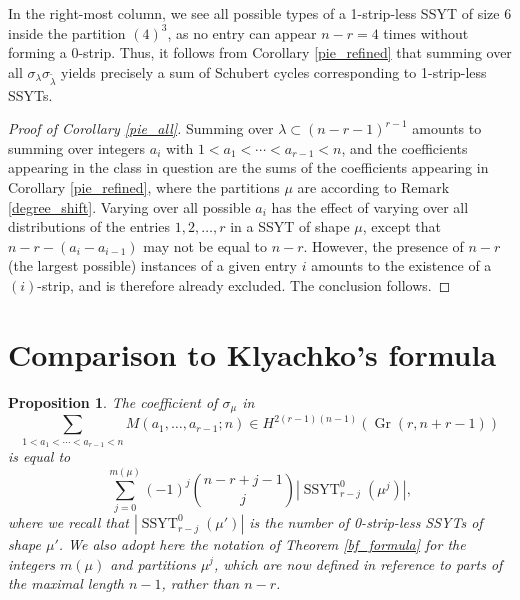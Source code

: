 \documentclass[11pt]{article}
\newtheorem{prop}[theo]{Proposition}
\theoremstyle{definition}
\numberwithin{equation}{section}
\DeclareMathOperator{\Gr}{Gr}
\DeclareMathOperator{\ssyt}{SSYT}
\begin{document}
In the right-most column, we see all possible types of a 1-strip-less SSYT of size 6 inside the partition $(4)^3$, as no entry can appear $n-r=4$ times without forming a $0$-strip. Thus, it follows from Corollary \ref{pie_refined} that summing over all $\sigma_{\lambda}\sigma_{\widetilde{\lambda}}$ yields precisely a sum of Schubert cycles corresponding to 1-strip-less SSYTs.

\begin{proof}[Proof of Corollary \ref{pie_all}]
Summing over $\lambda\subset(n-r-1)^{r-1}$ amounts to summing over integers $a_i$ with $1<a_1<\cdots<a_{r-1}<n$, and the coefficients appearing in the class in question are the sums of the coefficients appearing in Corollary \ref{pie_refined}, where the partitions $\mu$ are according to Remark \ref{degree_shift}. Varying over all possible $a_i$ has the effect of varying over all distributions of the entries $1,2,\ldots,r$ in a SSYT of shape $\mu$, except that $n-r-(a_{i}-a_{i-1})$ may not be equal to $n-r$. However, the presence of $n-r$ (the largest possible) instances of a given entry $i$ amounts to the existence of a $(i)$-strip, and is therefore already excluded. The conclusion follows.
\end{proof}

\section{Comparison to Klyachko's formula}\label{klyachko_comparison_sec}

\begin{prop}\label{coeffs_fill0}
The coefficient of $\sigma_\mu$ in 
\begin{equation*}
\sum_{1<a_1<\cdots<a_{r-1}<n}M(a_1,\ldots,a_{r-1};n)\in H^{2(r-1)(n-1)}(\Gr(r,n+r-1))
\end{equation*}
is equal to 
\begin{equation*}
\sum_{j=0}^{m(\mu)}(-1)^j\binom{n-r+j-1}{j}|\ssyt^0_{r-j}(\mu^j)|,
\end{equation*}
where we recall that $|\ssyt^0_{r-j}(\mu')|$ is the number of 0-strip-less SSYTs of shape $\mu'$. We also adopt here the notation of Theorem \ref{bf_formula} for the integers $m(\mu)$ and partitions $\mu^j$, which are now defined in reference to parts of the maximal length $n-1$, rather than $n-r$.
\end{prop}
\end{document}
